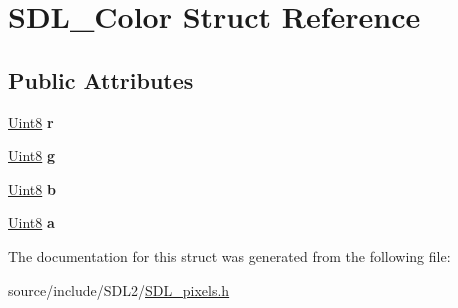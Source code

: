 \hypertarget{struct_s_d_l___color}{}\section{S\+D\+L\+\_\+\+Color Struct Reference}
\label{struct_s_d_l___color}
\subsection*{Public Attributes}
\begin{DoxyCompactItemize}
\item 
\hypertarget{struct_s_d_l___color_a0bb975b6829524133fdd3c6060cfa63d}{}\hyperlink{_s_d_l__stdinc_8h_a2944638813a090aa23e62f4da842c3e2}{Uint8} {\bfseries r}\label{struct_s_d_l___color_a0bb975b6829524133fdd3c6060cfa63d}

\item 
\hypertarget{struct_s_d_l___color_ae29d881bf740cfa7078b36e07f85d298}{}\hyperlink{_s_d_l__stdinc_8h_a2944638813a090aa23e62f4da842c3e2}{Uint8} {\bfseries g}\label{struct_s_d_l___color_ae29d881bf740cfa7078b36e07f85d298}

\item 
\hypertarget{struct_s_d_l___color_a3b79a27e0414049559aa5bcf241dedd3}{}\hyperlink{_s_d_l__stdinc_8h_a2944638813a090aa23e62f4da842c3e2}{Uint8} {\bfseries b}\label{struct_s_d_l___color_a3b79a27e0414049559aa5bcf241dedd3}

\item 
\hypertarget{struct_s_d_l___color_ac497ba67af6ecb4d51bdd0945b314526}{}\hyperlink{_s_d_l__stdinc_8h_a2944638813a090aa23e62f4da842c3e2}{Uint8} {\bfseries a}\label{struct_s_d_l___color_ac497ba67af6ecb4d51bdd0945b314526}

\end{DoxyCompactItemize}


The documentation for this struct was generated from the following file\+:\begin{DoxyCompactItemize}
\item 
source/include/\+S\+D\+L2/\hyperlink{_s_d_l__pixels_8h}{S\+D\+L\+\_\+pixels.\+h}\end{DoxyCompactItemize}
